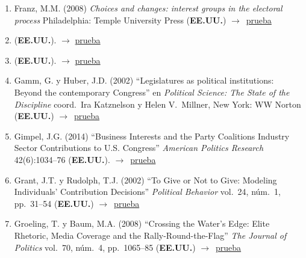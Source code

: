 \documentclass[12 pt, letter]{article}
\newenvironment{CitasMiTrabajo}{
    \begin{footnotesize}
    \begin{enumerate}[label={\footnotesize\emph{cita~\arabic*}},ref=\arabic*] %
        \setlength{\itemsep}{.1\itemsep}
        \setlength{\parskip}{.1\parskip}
    }{\end{enumerate}\end{footnotesize}}
\begin{document}
\begin{CitasMiTrabajo}
        \item Franz, M.M. (2008)
        \emph{Choices and changes:
        interest groups in the electoral process}
        Philadelphia: Temple University Press (\textbf{EE.UU.}) $\rightarrow$~\href{https://github.com/emagar/cv/blob/master/citasMiTrab/coxMagar/franz.pdf}{prueba}

        \item {} (\textbf{EE.UU.}).  $\rightarrow$ \href{https://www.jstor.org/stable/pdf/43495452.pdf?casa_token=ErTU6QC2C9gAAAAA:yyTvPo0PtAbRU5YfTluu7NqrgxCxVuw-6GxCDLu5U-sPmOSLf_MMzSULxzOJ1IoRhhmQkowqyNRRjhbHeXnDC6NJO_Yt5BQ8aXhrp59Zsl2VIUHm_20}{prueba}

       \item {} (\textbf{EE.UU.}).  $\rightarrow$ \href{https://doi.org/10.1177/2053168019877039}{prueba}

        \item Gamm, G. y  Huber, J.D. (2002)
        ``Legislatures as political
        institutions: Beyond the contemporary Congress'' en \emph{Political
        Science: The State of the Discipline} coord.\ Ira Katznelson y Helen
        V.\ Millner, New York: WW Norton  (\textbf{EE.UU.}) $\rightarrow$~\href{https://github.com/emagar/cv/blob/master/citasMiTrab/coxMagar/gamm.pdf}{prueba}

        \item Gimpel, J.G. (2014) ``Business Interests and the Party Coalitions Industry Sector Contributions to U.S. Congress'' \emph{American Politics Research} 42(6):1034--76 (\textbf{EE.UU.}). $\rightarrow$~\href{https://github.com/emagar/cv/blob/master/citasMiTrab/coxMagar/gimpel.etalBusPacs2014apr.pdf}{prueba}

        \item Grant, J.T. y Rudolph, T.J. (2002)
        ``To Give or Not to Give: Modeling Individuals' Contribution Decisions''
        \emph{Political Behavior} vol.\ 24, n\'um.\ 1, pp.\ 31--54 (\textbf{EE.UU.}) $\rightarrow$~\href{https://github.com/emagar/cv/blob/master/citasMiTrab/coxMagar/grant.pdf}{prueba}

        \item Groeling, T. y Baum, M.A. (2008)
        ``Crossing the Water's Edge: Elite Rhetoric,
        Media Coverage and the Rally-Round-the-Flag'' \emph{The Journal of Politics} vol.\ 70,
        n\'um.\ 4, pp.\ 1065--85 (\textbf{EE.UU.}) $\rightarrow$~\href{https://github.com/emagar/cv/blob/master/citasMiTrab/coxMagar/groe.pdf}{prueba}


\end{CitasMiTrabajo}
\end{document}
